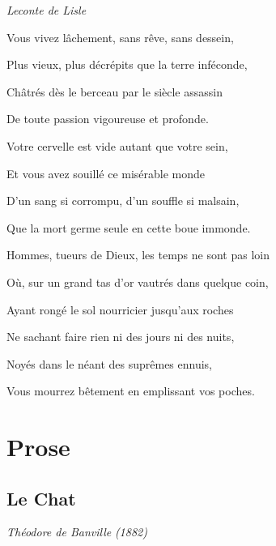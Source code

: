 \documentclass[openany]{book} %
\begin{document}
\textit{Leconte de Lisle}

\begin{center}
\par\noindent Vous vivez lâchement, sans rêve, sans dessein,
\par\noindent Plus vieux, plus décrépits que la terre inféconde,
\par\noindent Châtrés dès le berceau par le siècle assassin
\par\noindent De toute passion vigoureuse et profonde.

\par\noindent Votre cervelle est vide autant que votre sein,
\par\noindent Et vous avez souillé ce misérable monde
\par\noindent D’un sang si corrompu, d’un souffle si malsain,
\par\noindent Que la mort germe seule en cette boue immonde.

\par\noindent Hommes, tueurs de Dieux, les temps ne sont pas loin
\par\noindent Où, sur un grand tas d’or vautrés dans quelque coin,
\par\noindent Ayant rongé le sol nourricier jusqu’aux roches

\par\noindent Ne sachant faire rien ni des jours ni des nuits,
\par\noindent Noyés dans le néant des suprêmes ennuis,
\par\noindent Vous mourrez bêtement en emplissant vos poches.
\end{center}

\troisetoiles

\hypertarget{toc12}{}
\pagebreak[\PAGExBREAKxPOLICY]
\chapter{Prose}

\hypertarget{toc13}{}
\pagebreak[\PAGExSUBxBREAKxPOLICY]
\section{Le Chat}

\textit{Théodore de Banville}
\textit{(1882)}

\bigskip
\end{document}
